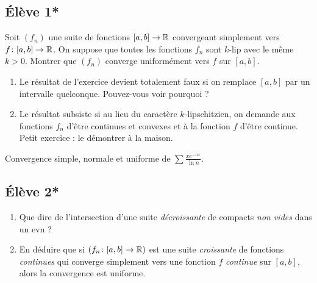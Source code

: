 \documentclass[10pt]{scrartcl}
\title{}
\author{}
\date{}
\begin{document}
    
    \subsection*{Élève 1*}
    \begin{exo}
        Soit $(f_n)$ une suite de fonctions $[a,b]\to \operatorname{\mathbb R}$ convergeant simplement vers $f\colon[a,b]\to\operatorname{\mathbb R}$. 
        On suppose que toutes les fonctions $f_n$ sont $k$-lip avec le même $k>0$. 
        Montrer que $(f_n)$ converge uniformément vers $f$ sur $[a,b]$.
    \end{exo}

    \begin{remarks}\hfill
        \begin{enumerate}
            \item Le résultat de l'exercice devient totalement faux si on remplace $[a,b]$ par un intervalle quelconque. Pouvez-vous voir pourquoi ?
            \item Le résultat subsiste si au lieu du caractère $k$-lipschitzien, on demande aux fonctions $f_n$ d'être continues et convexes et à la fonction $f$ d'être continue.
            Petit exercice : le démontrer à la maison.
        \end{enumerate}
    \end{remarks}

    \begin{exo}
        Convergence simple, normale et uniforme de $\sum\frac{xe^{-nx}}{\ln n}$.
    \end{exo}

    \subsection*{Élève 2*}
    \begin{exo}\hfill
        \begin{enumerate}
            \item Que dire de l'intersection d'une suite \textit{décroissante} de compacts \textit{non vides} dans un evn ?
            \item En déduire que si $(f_n\colon[a,b]\to\operatorname{\mathbb R})$ est une suite \textit{croissante} de fonctions \textit{continues} qui converge simplement vers une fonction $f$ \textit{continue} sur $[a,b]$, 
            alors la convergence est uniforme.
        \end{enumerate}
    \end{exo}
\end{document}
